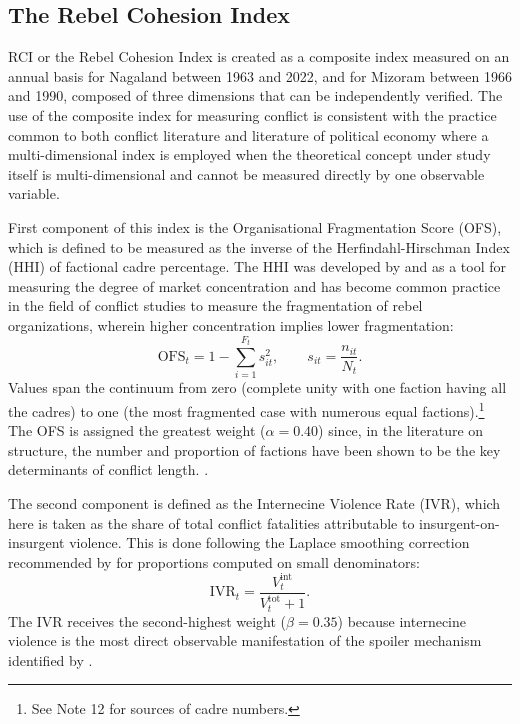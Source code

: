 \documentclass[12pt,a4paper]{article}
\begin{document}
\subsection{The Rebel Cohesion Index}

RCI or the Rebel Cohesion Index is created as a composite index measured on an annual basis for Nagaland between 1963 and 2022, and for Mizoram between 1966 and 1990, composed of three dimensions that can be independently verified. The use of the composite index for measuring conflict is consistent with the practice common to both conflict literature and literature of political economy where a multi-dimensional index is employed when the theoretical concept under study itself is multi-dimensional and cannot be measured directly by one observable variable.

First component of this index is the Organisational Fragmentation Score (OFS), which is defined to be measured as the inverse of the Herfindahl-Hirschman Index (HHI) of factional cadre percentage. The HHI was developed by \citet{herfindahl1950} and \citet{hirschman1945} as a tool for measuring the degree of market concentration and has become common practice in the field of conflict studies to measure the fragmentation of rebel organizations, wherein higher concentration implies lower fragmentation:
\begin{equation}
\mathrm{OFS}_t = 1 - \sum_{i=1}^{F_t} s_{it}^2, \qquad s_{it} = \frac{n_{it}}{N_t}.
\end{equation}
Values span the continuum from zero (complete unity with one faction having all the cadres) to one (the most fragmented case with numerous equal factions).\footnote{See Note 12 for sources of cadre numbers.} The OFS is assigned the greatest weight ($\alpha = 0.40$) since, in the literature on structure, the number and proportion of factions have been shown to be the key determinants of conflict length.\citet{cunningham2009} \citet{fjelde2012}.

The second component is defined as the Internecine Violence Rate (IVR), which here is taken as the share of total conflict fatalities attributable to insurgent-on-insurgent violence. This is done following the Laplace smoothing correction recommended by \citet{gelman2006} for proportions computed on small denominators:
\begin{equation}
\mathrm{IVR}_t = \frac{V^{\mathrm{int}}_t}{V^{\mathrm{tot}}_t + 1}.
\end{equation}
The IVR receives the second-highest weight ($\beta = 0.35$) because internecine violence is the most direct observable manifestation of the spoiler mechanism identified by \citet{stedman1997}.
\end{document}
